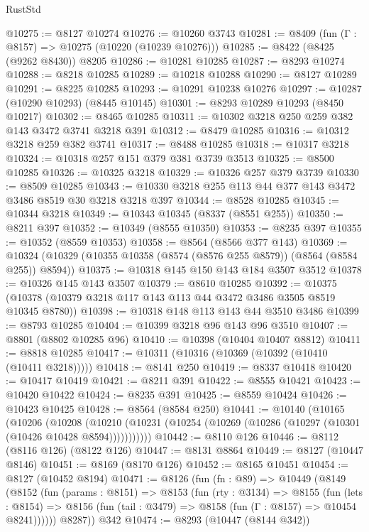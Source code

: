 \begin{lexlean}{RustStd}
\begin{coremodule}
@10275 := @8127 @10274
@10276 := @10260 @3743
@10281 := @8409 (fun (Γ : @8157) => @10275 (@10220 (@10239 @10276)))
@10285 := @8422 (@8425 (@9262 @8430)) @8205
@10286 := @10281 @10285
@10287 := @8293 @10274
@10288 := @8218 @10285
@10289 := @10218 @10288
@10290 := @8127 @10289
@10291 := @8225 @10285
@10293 := @10291 @10238 @10276
@10297 := @10287 (@10290 @10293) (@8445 @10145)
@10301 := @8293 @10289 @10293 (@8450 @10217)
@10302 := @8465 @10285
@10311 := @10302 @3218 @250 @259 @382 @143 @3472 @3741 @3218 @391
@10312 := @8479 @10285
@10316 := @10312 @3218 @259 @382 @3741
@10317 := @8488 @10285
@10318 := @10317 @3218
@10324 := @10318 @257 @151 @379 @381 @3739 @3513
@10325 := @8500 @10285
@10326 := @10325 @3218
@10329 := @10326 @257 @379 @3739
@10330 := @8509 @10285
@10343 := @10330 @3218 @255 @113 @44 @377 @143 @3472 @3486 @8519 @30 @3218 @3218 @397
@10344 := @8528 @10285
@10345 := @10344 @3218
@10349 := @10343 @10345 (@8337 (@8551 @255))
@10350 := @8211 @397
@10352 := @10349 (@8555 @10350)
@10353 := @8235 @397
@10355 := @10352 (@8559 @10353)
@10358 := @8564 (@8566 @377 @143)
@10369 := @10324 (@10329 (@10355 @10358 (@8574 (@8576 @255 @8579)) (@8564 (@8584 @255)) @8594))
@10375 := @10318 @145 @150 @143 @184 @3507 @3512
@10378 := @10326 @145 @143 @3507
@10379 := @8610 @10285
@10392 := @10375 (@10378 (@10379 @3218 @117 @143 @113 @44 @3472 @3486 @3505 @8519 @10345 @8780))
@10398 := @10318 @148 @113 @143 @44 @3510 @3486
@10399 := @8793 @10285
@10404 := @10399 @3218 @96 @143 @96 @3510
@10407 := @8801 (@8802 @10285 @96)
@10410 := @10398 (@10404 @10407 @8812)
@10411 := @8818 @10285
@10417 := @10311 (@10316 (@10369 (@10392 (@10410 (@10411 @3218)))))
@10418 := @8141 @250
@10419 := @8337 @10418
@10420 := @10417 @10419
@10421 := @8211 @391
@10422 := @8555 @10421
@10423 := @10420 @10422
@10424 := @8235 @391
@10425 := @8559 @10424
@10426 := @10423 @10425
@10428 := @8564 (@8584 @250)
@10441 := @10140
    (@10165
      (@10206
        (@10208
          (@10210 (@10231 (@10254 (@10269 (@10286 (@10297 (@10301 (@10426 @10428 @8594)))))))))))
@10442 := @8110 @126
@10446 := @8112 (@8116 @126) (@8122 @126)
@10447 := @8131 @8864
@10449 := @8127 (@10447 @8146)
@10451 := @8169 (@8170 @126)
@10452 := @8165 @10451
@10454 := @8127 (@10452 @8194)
@10471 := @8126
    (fun (fn : @89) =>
    @10449
      (@8149
        (@8152
          (fun (params : @8151) =>
          @8153
            (fun (rty : @3134) =>
            @8155
              (fun (lets : @8154) =>
              @8156 (fun (tail : @3479) => @8158 (fun (Γ : @8157) => @10454 @8241))))))
        @8287))
    @342
@10474 := @8293 (@10447 (@8144 @342))

\end{coremodule}
\end{lexlean}
